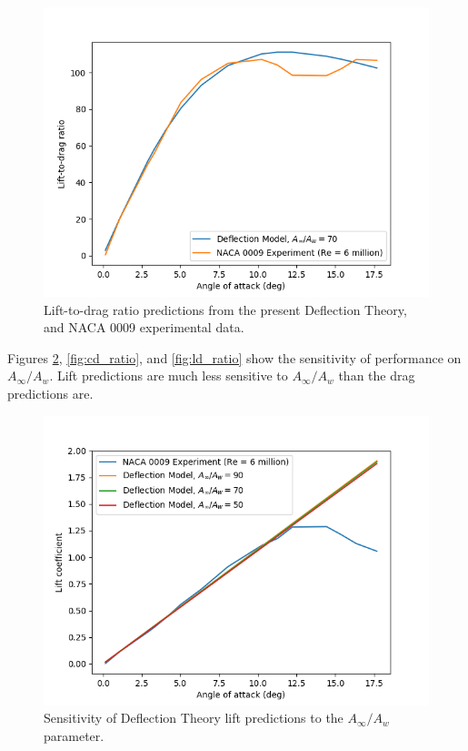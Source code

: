 \begin{figure}[htb]
\includegraphics[totalheight=4.5cm]{ld}
\caption{Lift-to-drag ratio predictions from the present Deflection Theory, and NACA 0009 experimental data.}
\label{fig:ld}
\end{figure}

Figures \ref{fig:cl_ratio}, \ref{fig:cd_ratio}, and \ref{fig:ld_ratio} show the sensitivity of performance on \(A_\infty / A_w\).
Lift predictions are much less sensitive to \(A_\infty / A_w\) than the drag predictions are.

\begin{figure}[htb]
\includegraphics[totalheight=4.5cm]{cl_ratio}
\caption{Sensitivity of Deflection Theory lift predictions to the \(A_\infty / A_w\) parameter.}
\label{fig:cl_ratio}
\end{figure}

